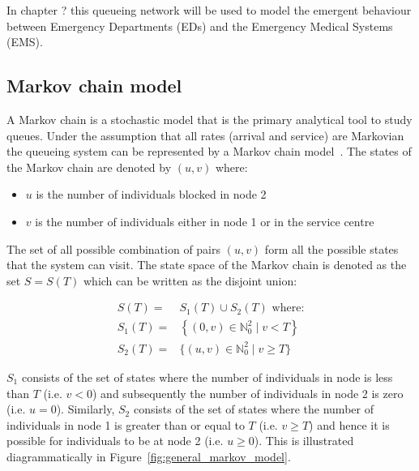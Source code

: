 In chapter ?
this queueing network will be used to model the emergent behaviour between
Emergency Departments (EDs) and the Emergency Medical Systems (EMS).





\subsection{Markov chain model}

A Markov chain is a stochastic model that is the primary analytical tool to
study queues.
Under the assumption that all rates (arrival and service) are Markovian the
queueing system can be represented by a Markov chain
model~\cite{kemeny1976markov}.
The states of the Markov chain are denoted by \((u,v)\) where:

\begin{itemize}
    \item \(u\) is the number of individuals blocked in node 2
    \item \(v\) is the number of individuals either in node 1 or in the
    service centre
\end{itemize}

The set of all possible combination of pairs \((u, v)\) form all the possible
states that the system can visit.
The state space of the Markov chain is denoted as the set \(S=S(T)\) which can
be written as the disjoint union:

\begin{align}
    S(T) =& S_1(T) \cup S_2(T) \text{ where:} \nonumber \\
    S_1(T) =& \left\{(0, v)\in\mathbb{N}_0^2 \; | \; v < T \right\}
    \label{eq:definition_of_S_as_disjoint_union} \\
    S_2(T) =& \{(u, v)\in\mathbb{N}_0^2 \; | \; v \geq T \} \nonumber
\end{align}

\(S_1\) consists of the set of states where the number of individuals in node
is less than \(T\) (i.e. \(v < 0\)) and subsequently the number of
individuals in node 2 is zero (i.e. \(u = 0\)).
Similarly, \(S_2\) consists of the set of states where the number of individuals
in node 1 is greater than or equal to \(T\) (i.e. \(v \geq T\)) and
hence it is possible for individuals to be at node 2 (i.e.
\(u \geq 0\)).
This is illustrated diagrammatically in Figure~\ref{fig:general_markov_model}.

